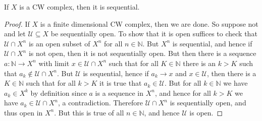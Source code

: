 \documentclass{article}                                                        %
\begin{document}
    \begin{theorem}
        If $X$ is a CW complex, then it is sequential.
    \end{theorem}
    \begin{proof}
        If $X$ is a finite dimensional CW complex, then we are done. So suppose
        not and let $\mathcal{U}\subseteq{X}$ be sequentially open. To show that
        it is open suffices to check that $\mathcal{U}\cap{X}^{n}$ is an open
        subset of $X^{n}$ for all $n\in\mathbb{N}$. But $X^{n}$ is sequential,
        and hence if $\mathcal{U}\cap{X}^{n}$ is not open, then it is not
        sequentially open. But then there is a sequence
        $a:\mathbb{N}\rightarrow{X}^{n}$ with limit $x\in\mathcal{U}\cap{X}^{n}$
        such that for all $K\in\mathbb{N}$ there is an $k>K$ such that
        $a_{k}\notin\mathcal{U}\cap{X}^{n}$. But $\mathcal{U}$ is sequential,
        hence if $a_{k}\rightarrow{x}$ and $x\in\mathcal{U}$, then there is a
        $K\in\mathbb{N}$ such that for all $k>K$ it is true that
        $a_{k}\in\mathcal{U}$. But for all $k\in\mathbb{N}$ we have
        $a_{k}\in{X}^{k}$ by definition since $a$ is a sequence in $X^{n}$, and
        hence for all $k>K$ we have $a_{k}\in\mathcal{U}\cap{X}^{n}$, a
        contradiction. Therefore $\mathcal{U}\cap{X}^{n}$ is sequentially open,
        and thus open in $X^{n}$. But this is true of all $n\in\mathbb{N}$, and
        hence $\mathcal{U}$ is open.
    \end{proof}
\end{document}
